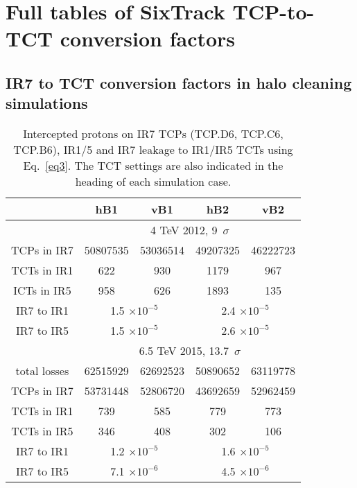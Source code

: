 \section{Full tables of SixTrack TCP-to-TCT conversion factors}
\subsection{IR7 to TCT conversion factors in halo cleaning simulations}
\begin{table}
   \centering
   \caption{Intercepted protons on IR7 TCPs (\textsc{TCP.D6, TCP.C6, TCP.B6}), IR1/5 and IR7 leakage to IR1/IR5 TCTs using Eq.~\ref{eq3}. The TCT settings are also indicated in the heading of each simulation case.}

   \begin{tabular}{c|cc|cc}

       & hB1 & vB1 & hB2 & vB2\\ \hline       
       & \multicolumn{4}{c}{4 TeV 2012, 9~$\sigma$} \\   %
       TCPs in IR7 & 50807535 & 53036514 & 49207325 & 46222723 \\
       TCTs in IR1 & 622 & 930 & 1179 & 967 \\
       ICTs in IR5 & 958 & 626 & 1893 & 135 \\ %
       IR7 to IR1  & \multicolumn{2}{c|}{1.5 $\times 10^{-5}$} & \multicolumn{2}{c}{2.4 $\times 10^{-5}$ } \\
       IR7 to IR5  & \multicolumn{2}{c|}{1.5 $\times 10^{-5}$} & \multicolumn{2}{c}{2.6 $\times 10^{-5}$ } \\
       \hline
       & \multicolumn{4}{c}{6.5 TeV 2015, 13.7~$\sigma$} \\      
       total losses & 62515929 & 62692523 & 50890652 & 63119778 \\
       TCPs in IR7 & 53731448 & 52806720 & 43692659 & 52962459 \\
       TCTs in IR1 & 739 & 585 & 779 & 773 \\
       TCTs in IR5 & 346 & 408 & 302 & 106 \\%
       IR7 to IR1 &  \multicolumn{2}{c|}{1.2 $\times 10^{-5}$} &  \multicolumn{2}{c}{1.6 $\times 10^{-5}$ } \\
       IR7 to IR5 &  \multicolumn{2}{c|}{7.1 $\times 10^{-6}$} &  \multicolumn{2}{c}{4.5 $\times 10^{-6}$ } \\
       \hline       


\end{tabular}
\end{table}
